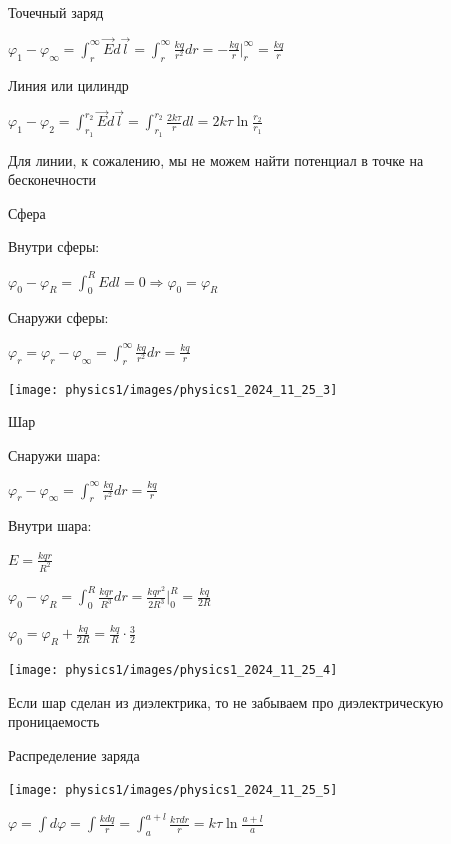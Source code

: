 \documentclass[12pt]{article}
\begin{document}
 Точечный заряд

$\varphi_1 - \varphi_\infty = \int_r^\infty \vec{E}d\vec{l} = \int_r^\infty \frac{kq}{r^2} dr = -\frac{kq}{r} \Big|_r^\infty = \frac{kq}{r}$

 Линия или цилиндр

$\varphi_1 - \varphi_2 = \int_{r_1}^{r_2} \vec{E}d\vec{l} = \int_{r_1}^{r_2} \frac{2k\tau}{r} dl = 2k\tau \ln\frac{r_2}{r_1}$

Для линии, к сожалению, мы не можем найти потенциал в точке на бесконечности

 Сфера

Внутри сферы:

$\varphi_0 - \varphi_R = \int_0^R Edl = 0 \Longrightarrow \varphi_0 = \varphi_R$

Снаружи сферы:

$\varphi_r = \varphi_r - \varphi_\infty = \int_r^\infty \frac{kq}{r^2} dr = \frac{kq}{r}$

\begin{center}
    \texttt{[image: physics1/images/physics1\_2024\_11\_25\_3]}
\end{center}

 Шар

Снаружи шара:

$\varphi_r - \varphi_\infty = \int_r^\infty \frac{kq}{r^2} dr = \frac{kq}{r}$

Внутри шара:

$E = \frac{kqr}{R^2}$

$\varphi_0 - \varphi_R = \int_0^R \frac{kqr}{R^3} dr = \frac{kqr^2}{2R^3} \Big|_0^R = \frac{kq}{2R}$

$\varphi_0 = \varphi_R + \frac{kq}{2R} = \frac{kq}{R} \cdot \frac{3}{2}$

\begin{center}
    \texttt{[image: physics1/images/physics1\_2024\_11\_25\_4]}
\end{center}

\Nota Если шар сделан из диэлектрика, то не забываем про диэлектрическую проницаемость

 Распределение заряда 

\begin{center}
    \texttt{[image: physics1/images/physics1\_2024\_11\_25\_5]}
\end{center}

$\varphi = \int d\varphi = \int \frac{kdq}{r} = \int_a^{a + l} \frac{k\tau dr}{r} = k\tau \ln\frac{a + l}{a}$
\end{document}
